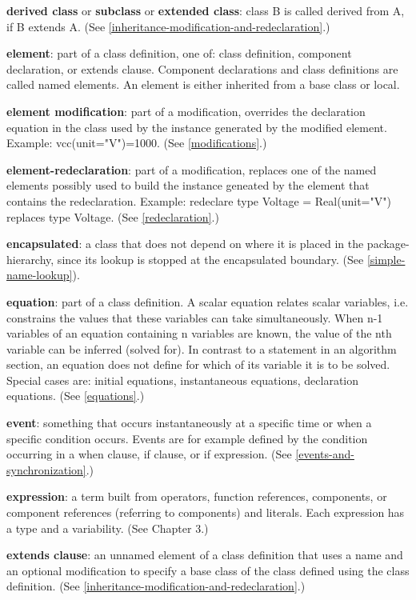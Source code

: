 \documentclass[10pt,a4paper]{report}
\begin{document}
\textbf{derived class} or \textbf{subclass} or \textbf{extended class}:
class B is called derived from A, if B extends A. (See \ref{inheritance-modification-and-redeclaration}.)

\textbf{element}: part of a class definition, one of: class definition,
component declaration, or extends clause. Component declarations and
class definitions are called named elements. An element is either
inherited from a base class or local.

\textbf{element modification}: part of a modification, overrides the
declaration equation in the class used by the instance generated by the
modified element. Example: vcc(unit="V")=1000. (See \ref{modifications}.)

\textbf{element-redeclaration}: part of a modification, replaces one of
the named elements possibly used to build the instance geneated by the
element that contains the redeclaration. Example: redeclare type Voltage
= Real(unit="V") replaces type Voltage. (See \ref{redeclaration}.)

\textbf{encapsulated}: a class that does not depend on where it is
placed in the package-hierarchy, since its lookup is stopped at the
encapsulated boundary. (See \ref{simple-name-lookup}).

\textbf{equation}: part of a class definition. A scalar equation relates
scalar variables, i.e. constrains the values that these variables can
take simultaneously. When n-1 variables of an equation containing n
variables are known, the value of the nth variable can be inferred
(solved for). In contrast to a statement in an algorithm section, an
equation does not define for which of its variable it is to be solved.
Special cases are: initial equations, instantaneous equations,
declaration equations. (See \ref{equations}.)

\textbf{event}: something that occurs instantaneously at a specific time
or when a specific condition occurs. Events are for example defined by
the condition occurring in a when clause, if clause, or if expression.
(See \ref{events-and-synchronization}.)

\textbf{expression}: a term built from operators, function references,
components, or component references (referring to components) and
literals. Each expression has a type and a variability. (See Chapter 3.)

\textbf{extends clause}: an unnamed element of a class definition that
uses a name and an optional modification to specify a base class of the
class defined using the class definition. (See \ref{inheritance-modification-and-redeclaration}.)
\end{document}
